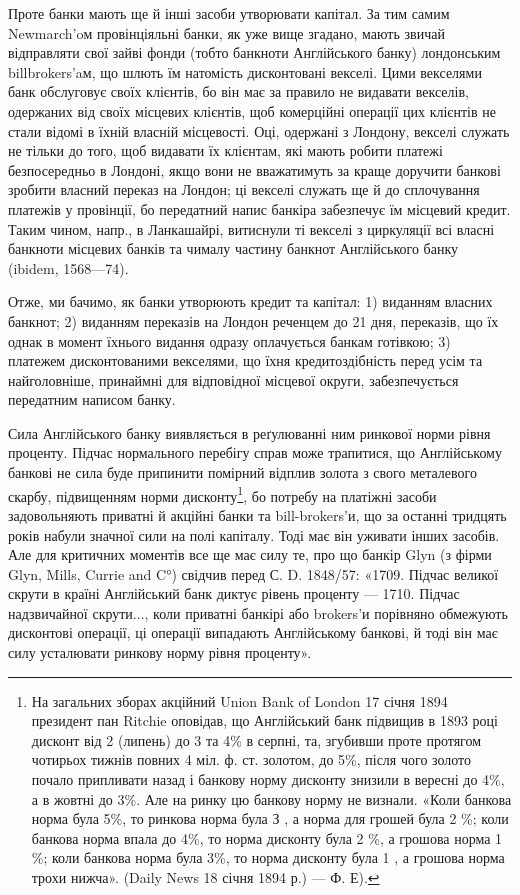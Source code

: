 Проте банки мають ще й інші засоби утворювати капітал. За тим самим
Newmarch’oм провінціяльні банки, як уже вище згадано, мають звичай відправляти
свої зайві фонди (тобто банкноти Англійського банку) лондонським billbrokers'aм,
що шлють їм натомість дисконтовані векселі. Цими векселями банк
обслуговує своїх клієнтів, бо він має за правило не видавати векселів, одержаних
від своїх місцевих клієнтів, щоб комерційні операції цих клієнтів не стали відомі
в їхній власній місцевості. Оці, одержані з Лондону, векселі служать не тільки
до того, щоб видавати їх клієнтам, які мають робити платежі безпосередньо
в Лондоні, якщо вони не вважатимуть за краще доручити банкові зробити
власний переказ на Лондон; ці векселі служать ще й до сплочування платежів
у провінції, бо передатний напис банкіра забезпечує їм місцевий кредит. Таким
чином, напр., в Ланкашайрі, витиснули ті векселі з циркуляції всі власні банкноти
місцевих банків та чималу частину банкнот Англійського банку (ibidem,
1568—74).

Отже, ми бачимо, як банки утворюють кредит та капітал: 1) виданням
власних банкнот; 2) виданням переказів на Лондон реченцем до 21 дня, переказів,
що їх однак в момент їхнього видання одразу оплачується банкам готівкою;
3) платежем дисконтованими векселями, що їхня кредитоздібність перед
усім та найголовніше, принаймні для відповідної місцевої округи, забезпечується
передатним написом банку.

Сила Англійського банку виявляється в реґулюванні ним ринкової норми
рівня проценту. Підчас нормального перебігу справ може трапитися, що Англійському
банкові не сила буде припинити помірний відплив золота з свого металевого
скарбу, підвищенням норми дисконту\footnote{
На загальних зборах акційний Union Bank of London 17 січня 1894 президент пан Ritchie
оповідав, що Англійський банк підвищив в 1893 році дисконт від 2  (липень) до 3 та 4\% в серпні,
та, згубивши проте протягом чотирьох тижнів повних 4  міл. ф. ст. золотом, до 5\%, після чого
золото почало припливати назад і банкову норму дисконту знизили в вересні до 4\%, а в жовтні до 3\%.
Але на ринку цю банкову норму не визнали. «Коли банкова норма була 5\%, то ринкова норма була З ,
а норма для грошей була 2 \%; коли банкова норма впала до 4\%, то норма дисконту була 2 \%, а
грошова норма 1 \%; коли банкова норма була 3\%, то норма дисконту була 1 , а грошова норма
трохи нижча». (Daily News 18 січня 1894 р.) — Ф. Е).
}, бо потребу на платіжні засоби
задовольняють приватні й акційні банки та bill-brokers’и, що за останні тридцять
років набули значної сили на полі капіталу. Тоді має він уживати інших
засобів. Але для критичних моментів все ще має силу те, про що банкір Glyn
(з фірми Glyn, Mills, Currie and C°) свідчив перед С. D. 1848/57: «1709. Підчас
великої скрути в країні Англійський банк диктує рівень проценту — 1710. Підчас
надзвичайної скрути..., коли приватні банкірі або brokers’и порівняно обмежують
дисконтові операції, ці операції випадають Англійському банкові, й тоді він має
силу усталювати ринкову норму рівня проценту».

